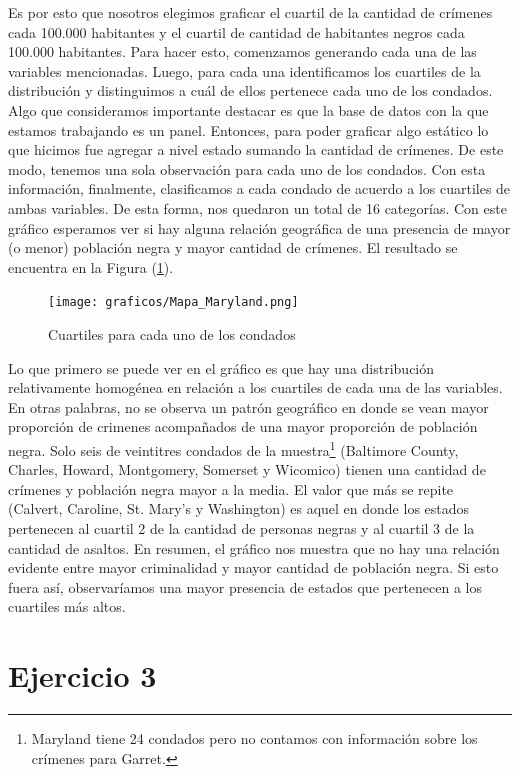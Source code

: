 \documentclass[12pt]{article}
\begin{document}
Es por esto que nosotros elegimos graficar el cuartil de la cantidad de crímenes cada 100.000 habitantes y el cuartil de cantidad de habitantes negros cada 100.000 habitantes. Para hacer esto, comenzamos generando cada una de las variables mencionadas. Luego, para cada una identificamos los cuartiles de la distribución y distinguimos a cuál de ellos pertenece cada uno de los condados. Algo que consideramos importante destacar es que la base de datos con la que estamos trabajando es un panel. Entonces, para poder graficar algo est\'atico lo que hicimos fue agregar a nivel estado sumando la cantidad de crímenes. De este modo, tenemos una sola observación para cada uno de los condados. Con esta información, finalmente, clasificamos a cada condado de acuerdo a los cuartiles de ambas variables. De esta forma, nos quedaron un total de 16 categorías.  Con este gráfico esperamos ver si hay alguna relación geográfica de una presencia de mayor (o menor) población negra y mayor cantidad de crímenes. El resultado se encuentra en la Figura (\ref{mapa}).

\begin{figure}[htbp]
    \centering
    \texttt{[image: graficos/Mapa\_Maryland.png]}
    \caption{Cuartiles para cada uno de los condados}
    \label{mapa}
\end{figure}

Lo que primero se puede ver en el gráfico es que hay una distribución relativamente homogénea en relación a los cuartiles de cada una de las variables. En otras palabras, no se observa un patrón geográfico en donde se vean mayor proporción de crimenes acompañados de una mayor proporción de población negra. Solo seis de veintitres condados de la muestra\footnote{Maryland tiene 24 condados pero no contamos con informaci\'on sobre los cr\'imenes para Garret.} (Baltimore County, Charles, Howard, Montgomery, Somerset y Wicomico) tienen una cantidad de cr\'imenes y poblaci\'on negra mayor a la media. El valor que m\'as se repite (Calvert, Caroline, St. Mary's y Washington) es aquel en donde los estados pertenecen al cuartil 2 de la cantidad de personas negras y al cuartil 3 de la cantidad de asaltos. En resumen, el gr\'afico nos muestra que no hay una relaci\'on evidente entre mayor criminalidad y mayor cantidad de poblaci\'on negra. Si esto fuera as\'i, observar\'iamos una mayor presencia de estados que pertenecen a los cuartiles m\'as altos. 





\section*{Ejercicio 3}
\end{document}
